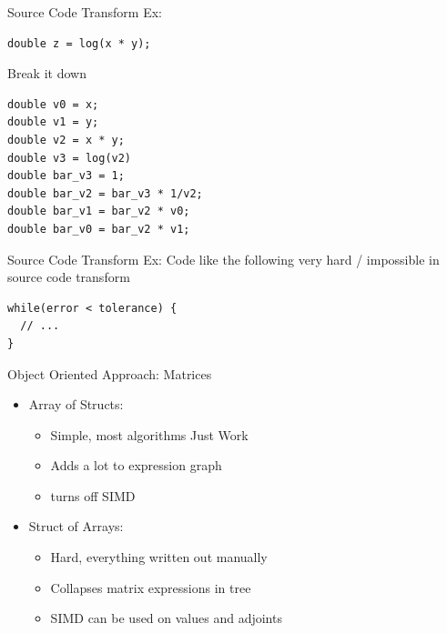 \documentclass[dvipsnames]{beamer}
\begin{document}
\begin{frame}[fragile]{Source Code Transform Ex:}
\begin{verbatim}
double z = log(x * y);
\end{verbatim}
Break it down
\begin{verbatim}
double v0 = x;
double v1 = y;
double v2 = x * y;
double v3 = log(v2)
double bar_v3 = 1;
double bar_v2 = bar_v3 * 1/v2;
double bar_v1 = bar_v2 * v0;
double bar_v0 = bar_v2 * v1;
\end{verbatim}
\end{frame}

\begin{frame}[fragile]{Source Code Transform Ex:}
Code like the following very hard / impossible in source code transform
\begin{verbatim}
while(error < tolerance) {
  // ...
}
\end{verbatim}
\end{frame}

\begin{frame}{Object Oriented Approach: Matrices}
\begin{itemize}
    \item Array of Structs:
    \begin{itemize}
        \item Simple, most algorithms Just Work\texttrademark
        \item Adds a lot to expression graph
        \item turns off SIMD
    \end{itemize}
    \item Struct of Arrays:
    \begin{itemize}
        \item Hard, everything written out manually
        \item Collapses matrix expressions in tree
        \item SIMD can be used on values and adjoints
    \end{itemize}
\end{itemize}
\end{frame}
\end{document}
